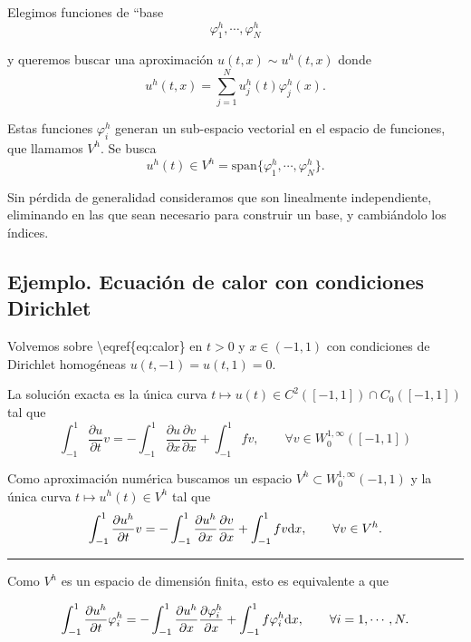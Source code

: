 Elegimos funciones de ``base\textquotesingle\textquotesingle{} \[
    \varphi^h_1, \cdots, \varphi^h_N
\]



y queremos buscar una aproximación \(u(t,x) \sim u^{h} (t,x)\) donde \[
    \tag{U}
    \label{eq:uh}
    u^{h} (t,x)= \sum_{j=1}^N u_j^h (t) \varphi^h_j (x).
\]



Estas funciones \(\varphi^h_i\) generan un sub-espacio vectorial en el
espacio de funciones, que llamamos \(V^h\). Se busca \[
    u^h (t) \in V^h = \mathrm{span} \{ \varphi^h_1, \cdots, \varphi^h_N \}.
\]



Sin pérdida de generalidad consideramos que son linealmente
independiente, eliminando en las que sean necesario para construir un
base, y cambiándolo los índices.

\subsection{Ejemplo. Ecuación de calor con condiciones
    Dirichlet}\label{ejemplo-ecuaciuxf3n-de-calor-con-condiciones-dirichlet-1}

Volvemos sobre \textbackslash eqref\{eq:calor\} en \(t > 0\) y
\(x \in (-1,1)\) con condiciones de Dirichlet homogéneas
\(u(t,-1) = u(t,1) = 0\).

La solución exacta es la única curva
\(t \mapsto u(t) \in C^2([-1,1] ) \cap C_0([-1,1])\) tal que \[
    \int_{-1}^1 \frac{\partial u}{\partial t} v = - \int_{-1}^1 \frac{\partial u}{\partial x} \frac{\partial v}{\partial x} + \int_{-1}^1 f v , \qquad \forall v \in
    W_0^{1,\infty}([-1,1])
\]



Como aproximación numérica buscamos un espacio
\(V^h \subset W_0^{1,\infty} (-1,1)\) y la única curva
\(t \mapsto u^h(t) \in V^h\) tal que \[
    \int_{-1}^1 \frac{\partial u^h}{\partial t} v
    = - \int_{-1}^1 \frac{\partial u^h}{\partial x} \frac{\partial v}{\partial x}
    + \int_{-1}^1 f v \mathrm{d} x
    , \qquad  \forall v \in V^h.
\]

\begin{center}\rule{0.5\linewidth}{0.5pt}\end{center}

Como \(V^h\) es un espacio de dimensión finita, esto es equivalente a
que

\[
    \int_{-1}^1 \frac{\partial u^h}{\partial t} \varphi_i^h
    = - \int_{-1}^1 \frac{\partial u^h}{\partial x} \frac{\partial \varphi_i^h}{\partial x}
    + \int_{-1}^1 f \varphi_i^h \mathrm{d} x
    , \qquad  \forall i = 1, \cdots, N.
\]



